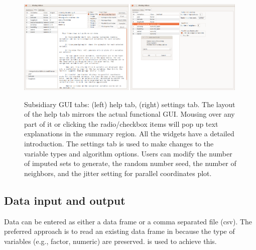 \documentclass[article]{jss}
\begin{document}
\begin{figure}[!h]
\begin{centering}
\includegraphics[width=0.49\textwidth]{graph/fig1-GUI-tab2} 
\includegraphics[width=0.49\textwidth]{graph/fig1-GUI-tab3}
\par\end{centering}
\caption{Subsidiary GUI tabs: (left) help tab, (right) settings
tab. The layout of the help tab mirrors the actual functional
GUI. Mousing over any part of it or clicking the radio/checkbox
items will pop up text explanations in the summary region. All
the widgets have a detailed introduction. The settings tab is
used to make changes to the variable types and algorithm options.
Users can modify the number of imputed sets to generate, the
random number seed, the number of neighbors, and the jitter
setting for parallel coordinates plot.}
\label{fig: missingGUI-tabs}
\end{figure}


\subsection{Data input and output}

Data can be entered as either a data frame or a comma separated
file (csv). The preferred approach is to read an existing data
frame in  because the type of variables (e.g.,
factor, numeric) are preserved. 
is used to achieve this.
\end{document}
